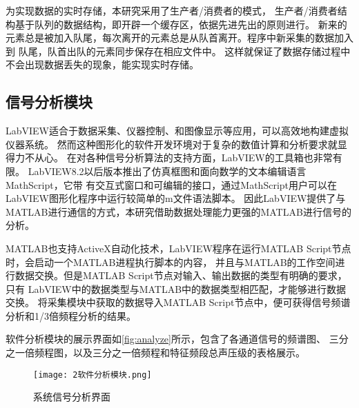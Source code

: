 为实现数据的实时存储，本研究采用了生产者/消费者的模式，
生产者/消费者结构基于队列的数据结构，即开辟一个缓存区，依据先进先出的原则进行\cite{马瑾2015基于}。
新来的元素总是被加入队尾，每次离开的元素总是从队首离开。程序中新采集的数据加入到
队尾，队首出队的元素同步保存在相应文件中。
这样就保证了数据存储过程中不会出现数据丢失的现象，能实现实时存储。
\begin{comment}
数据采集程序框图如\autoref{fig:soft}所示。
\begin{figure}[htbp]
    \centering
    \texttt{[image: 2数据采集程序框图.jpg]}
    \caption{\label{fig:soft}数据采集程序框图}
\end{figure}
\end{comment}

\subsection{信号分析模块}
LabVIEW适合于数据采集、仪器控制、和图像显示等应用，可以高效地构建虚拟仪器系统。
然而这种图形化的软件开发环境对于复杂的数值计算和分析要求就显得力不从心。
在对各种信号分析算法的支持方面，LabVIEW的工具箱也非常有限。
LabVIEW8.2以后版本推出了仿真框图和面向数学的文本编辑语言MathScript，它带
有交互式窗口和可编辑的接口，通过MathScript用户可以在LabVIEW图形化程序中运行较简单的m文件语法脚本\cite{周惠2007LabVIEW,柴敬安2008Labview}。
因此LabVIEW提供了与MATLAB进行通信的方式，本研究借助数据处理能力更强的MATLAB进行信号的分析。

MATLAB也支持ActiveX自动化技术，LabVIEW程序在运行MATLAB Script节点时，会启动一个MATLAB进程执行脚本的内容，
并且与MATLAB的工作空间进行数据交换。但是MATLAB Script节点对输入、输出数据的类型有明确的要求，只有
LabVIEW中的数据类型与MATLAB中的数据类型相匹配，才能够进行数据交换\cite{苏宝定2008基于}。
将采集模块中获取的数据导入MATLAB Script节点中，便可获得信号频谱分析和1/3倍频程分析的结果。
\begin{comment}
\begin{figure}[htbp]
    \centering
    \texttt{[image: 2倍频程程序.png]}
    \caption{\label{fig:otc}mathscript节点部分进行1/3倍频程分析的程序}
\end{figure}
\end{comment}

软件分析模块的展示界面如\autoref{fig:analyze}所示，包含了各通道信号的频谱图、
三分之一倍频程图，以及三分之一倍频程和特征频段总声压级的表格展示。
\begin{figure}[htbp]
    \centering
    \texttt{[image: 2软件分析模块.png]}
    \caption{\label{fig:analyze}系统信号分析界面}
\end{figure}

